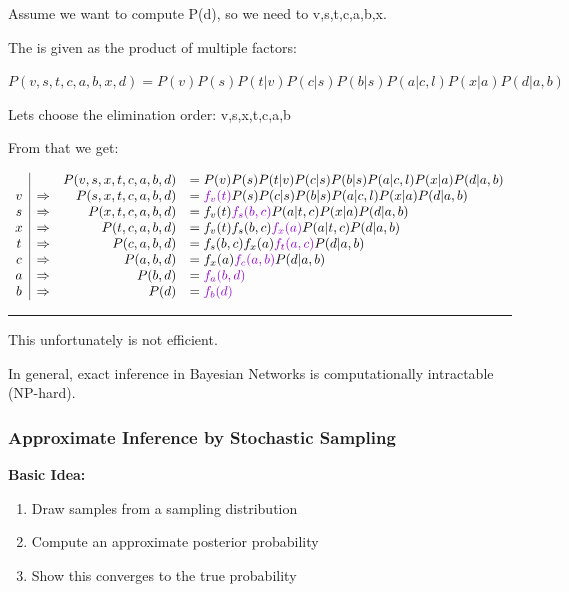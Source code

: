 \documentclass[
../EiKI_Summary.tex,
]
{subfiles}
\begin{document}
Assume we want to compute P(d), so we need to  v,s,t,c,a,b,x.

The  is given as the product of multiple factors:

\begin{csmb*}
    $P(v,s,t,c,a,b,x,d) = P(v)P(s)P(t|v)P(c|s)P(b|s)P(a|c,l)P(x|a)P(d|a,b)$
\end{csmb*}

Lets choose the elimination order: v,s,x,t,c,a,b

From that we get:

\begin{csmb*}
    $\begin{array}{c|c r l}
        && P(v,s,x,t,c,a,b,d) &= P(v)P(s)P(t|v)P(c|s)P(b|s)P(a|c,l)P(x|a)P(d|a,b)\\
        v&\Rightarrow & P(s,x,t,c,a,b,d) &= \defco{f_v(t)}P(s)P(c|s)P(b|s)P(a|c,l)P(x|a)P(d|a,b)\\
        s&\Rightarrow & P(x,t,c,a,b,d) &= f_v(t)\defco{f_s(b,c)}P(a|t,c)P(x|a)P(d|a,b)\\
        x&\Rightarrow & P(t,c,a,b,d) &= f_v(t)f_s(b,c)\defco{f_x(a)}P(a|t,c)P(d|a,b)\\
        t&\Rightarrow & P(c,a,b,d) &= f_s(b,c)f_x(a)\defco{f_t(a,c)}P(d|a,b)\\
        c&\Rightarrow & P(a,b,d) &= f_x(a)\defco{f_c(a,b)}P(d|a,b)\\
        a&\Rightarrow & P(b,d) &= \defco{f_a(b,d)}\\
        b&\Rightarrow & P(d) &= \defco{f_b(d)}\\
    \end{array}$
\end{csmb*}

\hrule

This unfortunately is not efficient. 

\begin{center}
    \begin{smalldefbox}
        [Theorem]
        In general, exact inference in Bayesian Networks is computationally intractable (NP-hard).
    \end{smalldefbox}
\end{center}

\subsubsection{Approximate Inference by Stochastic Sampling}
\textbf{Basic Idea:}
\begin{enumerate}
    \item Draw  samples from a sampling distribution 
    \item Compute an approximate posterior probability 
    \item Show this converges to the true probability 
\end{enumerate}
\end{document}
